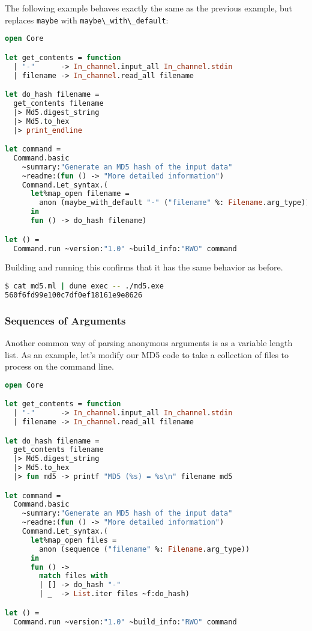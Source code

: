 The following example behaves exactly the same as the previous example,
but replaces \passthrough{\lstinline!maybe!} with
\passthrough{\lstinline!maybe\_with\_default!}:

\begin{lstlisting}[language=Caml]
open Core

let get_contents = function
  | "-"      -> In_channel.input_all In_channel.stdin
  | filename -> In_channel.read_all filename

let do_hash filename =
  get_contents filename
  |> Md5.digest_string
  |> Md5.to_hex
  |> print_endline

let command =
  Command.basic
    ~summary:"Generate an MD5 hash of the input data"
    ~readme:(fun () -> "More detailed information")
    Command.Let_syntax.(
      let%map_open filename =
        anon (maybe_with_default "-" ("filename" %: Filename.arg_type))
      in
      fun () -> do_hash filename)

let () =
  Command.run ~version:"1.0" ~build_info:"RWO" command
\end{lstlisting}

Building and running this confirms that it has the same behavior as
before.

\begin{lstlisting}[language=bash]
$ cat md5.ml | dune exec -- ./md5.exe
560f6fd99e100c7df0ef18161e9e8626
\end{lstlisting}

\hypertarget{sequences-of-arguments}{%
\subsubsection{Sequences of Arguments}\label{sequences-of-arguments}}

Another common way of parsing anonymous arguments is as a variable
length list. As an example, let's modify our MD5 code to take a
collection of files to process on the command line.

\begin{lstlisting}[language=Caml]
open Core

let get_contents = function
  | "-"      -> In_channel.input_all In_channel.stdin
  | filename -> In_channel.read_all filename

let do_hash filename =
  get_contents filename
  |> Md5.digest_string
  |> Md5.to_hex
  |> fun md5 -> printf "MD5 (%s) = %s\n" filename md5

let command =
  Command.basic
    ~summary:"Generate an MD5 hash of the input data"
    ~readme:(fun () -> "More detailed information")
    Command.Let_syntax.(
      let%map_open files =
        anon (sequence ("filename" %: Filename.arg_type))
      in
      fun () ->
        match files with
        | [] -> do_hash "-"
        | _  -> List.iter files ~f:do_hash)

let () =
  Command.run ~version:"1.0" ~build_info:"RWO" command
\end{lstlisting}

